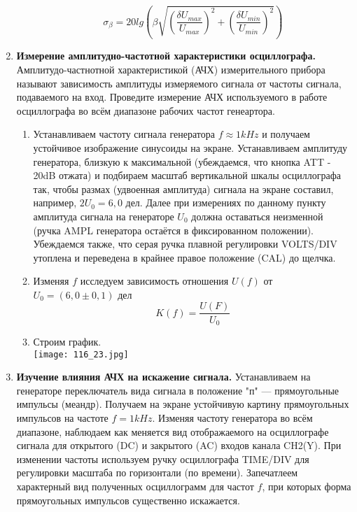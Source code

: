 \documentclass[a4paper, 12pt]{article}%
\begin{document}
\begin{enumerate}
\begin{enumerate}
	\[ \sigma_{\beta} = 20 lg \left( \beta \sqrt{\left( \dfrac{\delta U_{max}}{U_{max}} \right)^2 + \left( \dfrac{\delta U_{min}}{U_{min}} \right)^2} \right) \]
	\end{enumerate}
	\item \textbf{Измерение амплитудно-частотной характеристики осциллографа.} \\ Амплитудо-частнотной характеристикой (АЧХ) измерительного прибора называют зависимость амплитуды измеряемого сигнала от частоты сигнала, подаваемого на вход. Проведите измерение АЧХ используемого в работе осциллографа во всём диапазоне рабочих частот генеартора.
	\begin{enumerate}
	\item Устанавливаем частоту сигнала генератора $f \approx 1 kHz$ и получаем устойчивое изображение синусоиды на экране. Устанавливаем амплитуду генератора, близкую к максимальной (убеждаемся, что кнопка ATT - 20dB отжата) и подбираем масштаб вертикальной шкалы осциллографа так, чтобы размах (удвоенная амплитуда) сигнала на экране составил, например, $2 U_0 = 6,0$ дел. Далее при измерениях по данному пункту амплитуда сигнала на генераторе $U_0$ должна оставаться неизменной (ручка AMPL генератора остаётся в фиксированном положении). Убеждаемся также, что серая ручка плавной регулировки VOLTS/DIV утоплена и переведена в крайнее правое положение (CAL) до щелчка.
	\item Изменяя $f$ исследуем зависимость отношения $U(f)$ от $U_0 = (6,0 \pm 0,1)$ дел
	\[K(f) = \dfrac{U(F)}{U_0}\]
	\begin{figure} [h]
	\end{figure}
	\item Строим график. \\
	\texttt{[image: 116\_23.jpg]} \\
	\end{enumerate}
	\item \textbf{Изучение влияния АЧХ на искажение сигнала.} Устанавливаем на генераторе переключатель вида сигнала в положение "п" — прямоугольные импульсы (меандр). Получаем на экране устойчивую картину прямоугольных импульсов на частоте $f = 1 kHz$. Изменяя частоту генератора во всём диапазоне, наблюдаем как меняется вид отображаемого на осциллографе сигнала для открытого (DC) и закрытого (AC) входов канала CH2(Y). При изменении частоты используем ручку осциллографа TIME/DIV для регулировки масштаба по горизонтали (по времени). Запечатлеем характерный вид полученных осциллограмм для частот $f$, при которых форма прямоугольных импульсов существенно искажается.\\

\end{enumerate}
\end{document}
